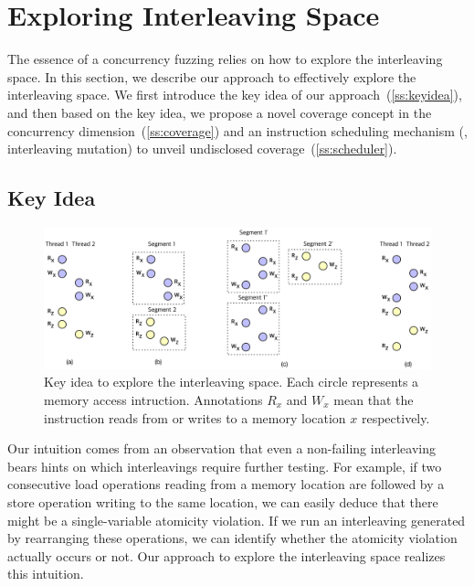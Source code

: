 \section{Exploring Interleaving Space}
\label{s:design}

\newcommand{\segment}{segment graph\xspace}
\newcommand{\segments}{segment graphs\xspace}
\newcommand{\Segments}{Segment graphs\xspace}

\newcommand{\mutable}{mutable edge\xspace}
\newcommand{\mutables}{mutable edges\xspace}
\newcommand{\immutable}{immutable edge\xspace}
\newcommand{\immutables}{immutable edges\xspace}


The essence of a concurrency fuzzing relies on how to explore the
interleaving space.
%
In this section, we describe our approach to effectively explore the
interleaving space.
%
We first introduce the key idea of our
approach~(\autoref{ss:keyidea}), and then based on the key idea, we
propose a novel coverage concept in the concurrency
dimension~(\autoref{ss:coverage}) and an instruction scheduling
mechanism (\ie, interleaving mutation) to unveil undisclosed
coverage~(\autoref{ss:scheduler}).

\subsection{Key Idea}
\label{ss:keyidea}

\begin{figure}[t]
  \includegraphics[width=0.9\linewidth]{fig/intuition.pdf}
  \caption{Key idea to explore the interleaving space. Each circle
    represents a memory access intruction. Annotations $R_x$ and $W_x$
    mean that the instruction reads from or writes to a memory
    location $x$ respectively.}
  \label{fig:intuition}
\end{figure}

Our intuition comes from an observation that even a non-failing
interleaving bears hints on which interleavings require further
testing.
%
For example, if two consecutive load operations reading from a memory
location are followed by a store operation writing to the same
location, we can easily deduce that there might be a single-variable
atomicity violation.
%
If we run an interleaving generated by rearranging these operations,
we can identify whether the atomicity violation actually occurs or
not.
%
Our approach to explore the interleaving space realizes this
intuition.


